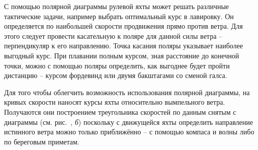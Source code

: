 С помощью полярной диаграммы рулевой яхты может решать различные
тактические задачи, например выбрать оптимальный курс в лавировку. Он
определяется по наибольшей скорости продвижения прямо против
ветра. Для этого следует провести касательную к поляре для данной силы
ветра \--- перпендикуляр к его направлению. Точка касания поляры
указывает наиболее выгодный курс. При плавании полным курсом, зная
расстояние до конечной точки, можно с помощью поляры определить, как
выгоднее будет пройти дистанцию \--- курсом фордевинд или двумя
бакштагами со сменой галса.

Для того чтобы облегчить возможность использования полярной диаграммы,
на кривых скорости наносят курсы яхты относительно вымпельного
ветра. Получаются они построением треугольника скоростей по данным
снятым с диаграммы (см. рис.~, \textit{б}) поскольку с
движущейся яхты определить направление истинного ветра можно только
приближённо \--- с помощью компаса и волны либо по береговым приметам.

\onecolumn

